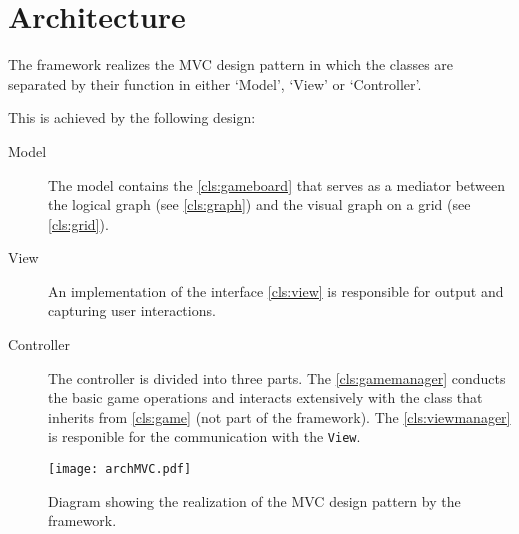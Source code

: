 \section{Architecture}
The \graphioli \gls{framework} realizes the \gls{MVC} design pattern in which the classes are separated by their function in either `Model', `View' or `Controller'.\par
This is achieved by the following design:\par

\begin{description}
	\item[Model] The model contains the \ref{cls:gameboard} that serves as a mediator between the logical \gls{graph} (see \ref{cls:graph}) and the visual graph on a \gls{grid} (see \ref{cls:grid}).
	\item[View] An implementation of the \gls{interface} \ref{cls:view} is responsible for output and capturing user interactions.
	\item[Controller] The controller is divided into three parts. The \ref{cls:gamemanager} conducts the basic game operations and interacts extensively with the class that inherits from \ref{cls:game} (not part of the framework). The \ref{cls:viewmanager} is responible for the communication with the \texttt{View}.
\end{description}

\begin{figure}[h]
	\centering
	\texttt{[image: archMVC.pdf]}
	\caption{Diagram showing the realization of the \gls{MVC} design pattern by the framework.}
	\label{img:archMVC}
\end{figure}
